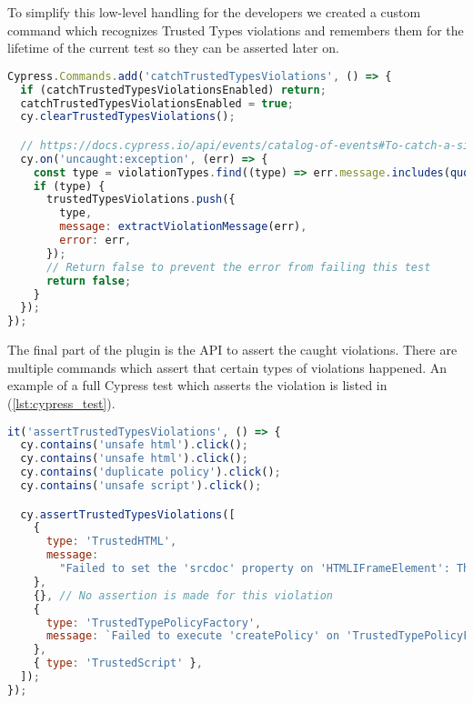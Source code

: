 To simplify this low-level handling for the developers we created a custom command which recognizes
Trusted Types violations and remembers them for the lifetime of the current test so they can be
asserted later on.

\vspace{3mm}
\bigskip
\begin{lstlisting}[language=JavaScript, caption=Custom command to catch Trusted Types violations]
Cypress.Commands.add('catchTrustedTypesViolations', () => {
  if (catchTrustedTypesViolationsEnabled) return;
  catchTrustedTypesViolationsEnabled = true;
  cy.clearTrustedTypesViolations();

  // https://docs.cypress.io/api/events/catalog-of-events#To-catch-a-single-uncaught-exception
  cy.on('uncaught:exception', (err) => {
    const type = violationTypes.find((type) => err.message.includes(quote(type)));
    if (type) {
      trustedTypesViolations.push({
        type,
        message: extractViolationMessage(err),
        error: err,
      });
      // Return false to prevent the error from failing this test
      return false;
    }
  });
});
\end{lstlisting}
\vspace{3mm}

The final part of the plugin is the API to assert the caught violations. There are multiple commands
which assert that certain types of violations happened. An example of a full Cypress test which
asserts the violation is listed in (\ref{lst:cypress_test}).

\vspace{50mm}

\bigskip
\begin{lstlisting}[language=JavaScript, caption=Example Trusted Types violation test, label={lst:cypress_test}]
it('assertTrustedTypesViolations', () => {
  cy.contains('unsafe html').click();
  cy.contains('unsafe html').click();
  cy.contains('duplicate policy').click();
  cy.contains('unsafe script').click();

  cy.assertTrustedTypesViolations([
    {
      type: 'TrustedHTML',
      message:
        "Failed to set the 'srcdoc' property on 'HTMLIFrameElement': This document requires 'TrustedHTML' assignment.",
    },
    {}, // No assertion is made for this violation
    {
      type: 'TrustedTypePolicyFactory',
      message: `Failed to execute 'createPolicy' on 'TrustedTypePolicyFactory': Policy with name "my-policy" already exists.`,
    },
    { type: 'TrustedScript' },
  ]);
});
\end{lstlisting}

